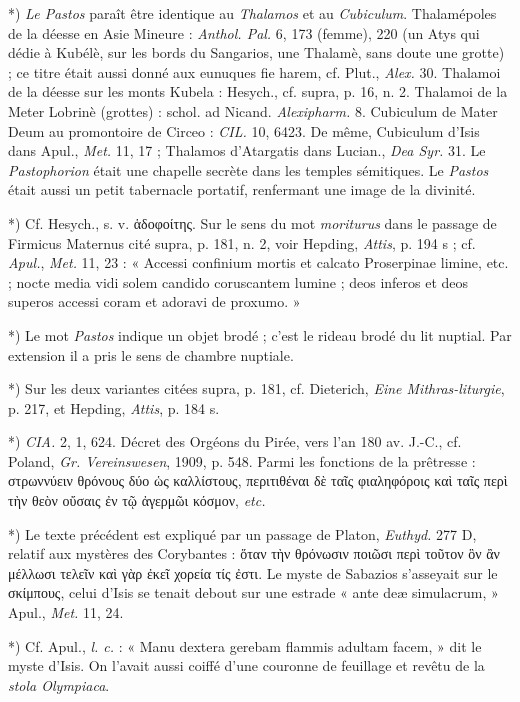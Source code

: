 \documentclass[a4paper, 11pt, oneside, polutonikogreek, french]{article}
\begin{document}
*) \emph{Le Pastos} paraît être identique au \emph{Thalamos} et au \emph{Cubiculum}. Thalamépoles de la déesse en Asie Mineure : \emph{Anthol. Pal.} 6, 173 (femme), 220 (un Atys qui dédie à Kubélè, sur les bords du Sangarios, une Thalamè, sans doute une grotte) ; ce titre était aussi donné aux eunuques fie harem, cf. Plut., \emph{Alex.} 30. Thalamoi de la déesse sur les monts Kubela : Hesych., cf. supra, p. 16, n. 2. Thalamoi de la Meter Lobrinè (grottes) : schol. ad Nicand. \emph{Alexipharm.} 8. Cubiculum de Mater Deum au promontoire de Circeo : \emph{CIL.} 10, 6423. De même, Cubiculum d'Isis dans Apul., \emph{Met.} 11, 17 ; Thalamos d'Atargatis dans Lucian., \emph{Dea Syr.} 31. Le \emph{Pastophorion} était une chapelle secrète dans les temples sémitiques. Le \emph{Pastos} était aussi un petit tabernacle portatif, renfermant une image de la divinité.

*) Cf. Hesych., s. v. ἁδοφοίτης. Sur le sens du mot \emph{moriturus} dans le passage de Firmicus Maternus cité supra, p. 181, n. 2, voir Hepding, \emph{Attis}, p. 194 s ; cf. \emph{Apul.}, \emph{Met.} 11, 23 : « Accessi confinium mortis et calcato Proserpinae limine, etc. ; nocte media vidi solem candido coruscantem lumine ; deos inferos et deos superos accessi coram et adoravi de proxumo. »

*) Le mot \emph{Pastos} indique un objet brodé ; c'est le rideau brodé du lit nuptial. Par extension il a pris le sens de chambre nuptiale.

*) Sur les deux variantes citées supra, p. 181, cf. Dieterich, \emph{Eine Mithras-liturgie}, p. 217, et Hepding, \emph{Attis}, p. 184 s.

*) \emph{CIA.} 2, 1, 624. Décret des Orgéons du Pirée, vers l'an 180 av. J.-C., cf. Poland, \emph{Gr. Vereinswesen}, 1909, p. 548. Parmi les fonctions de la prêtresse : στρωννύειν θρόνους δύο ὡς καλλίστους, περιτιθέναι δὲ ταῖς φιαληφόροις καὶ ταῖς περὶ τὴν θεὸν οὔσαις ἐν τῷ ἀγερμῶι κόσμον, \emph{etc.}

*) Le texte précédent est expliqué par un passage de Platon, \emph{Euthyd.} 277 D, relatif aux mystères des Corybantes : ὅταν τὴν θρόνωσιν ποιῶσι περὶ τοῦτον ὃν ἂν μέλλωσι τελεῖν καὶ γὰρ ἐκεῖ χορεία τίς ἐστι. Le myste de Sabazios s'asseyait sur le σκίμπους, celui d'Isis se tenait debout sur une estrade « ante deæ simulacrum, » Apul., \emph{Met.} 11, 24.

*) Cf. Apul., \emph{l. c.} : « Manu dextera gerebam flammis adultam facem, » dit le myste d'Isis. On l'avait aussi coiffé d'une couronne de feuillage et revêtu de la \emph{stola Olympiaca}.
\end{document}
